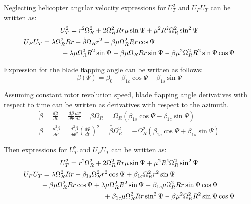 Neglecting helicopter angular velocity expressions for $U_T^2$ and $U_P U_T$ can be written as:
\begin{gather}
  \label{eq-aero-u-t-sq}
  U_T^2 =
  r^2 \Omega_R^2 + 2 \Omega_R^2 R r \mu \sin \Psi
  + \mu^2 R^2 \Omega_R^2 \sin^2 \Psi \\
  \label{eq-aero-u-p-u-t}
  \begin{multlined}[0.88\textwidth]
  U_P U_T =
  \lambda \Omega_R^2 R r - \dot \beta \Omega_R r^2
  - \beta \mu \Omega_R^2 R r \cos \Psi \\
  + \lambda \mu \Omega_R^2 R^2 \sin \Psi
  - \dot \beta \mu \Omega_R R r \sin \Psi
  - \beta \mu^2 \Omega_R^2 R^2 \sin \Psi \cos \Psi
  \end{multlined}
\end{gather}

Expression for the blade flapping angle can be written as follows: \cite{GessowMyers1985, Padfield2007, NASA-TT-F-494}
\begin{equation}
  \label{eq-aero-blade-flapping-angle}
  \beta \left( \Psi \right) = 
  \beta_0 + \beta_{1c} \cos \Psi + \beta_{1s} \sin \Psi
\end{equation}

Assuming constant rotor revolution speed, blade flapping angle derivatives with respect to time can be written as derivatives with respect to the azimuth. \cite{GessowMyers1985}
\begin{gather}
  \dot \beta = \frac{d\beta}{dt}
  = \frac{d\beta}{d\Psi} \frac{d\Psi}{dt} =
  \bar \beta \Omega_R =
  \Omega_R
  \left( \beta_{1s} \cos \Psi - \beta_{1c} \sin \Psi \right) \\
  \ddot \beta = \frac{d^2\beta}{dt^2}
  = \frac{d^2\beta}{d\Psi^2} \left( \frac{d\Psi}{dt} \right)^2 = 
  \bar{\bar \beta} \Omega_R^2
  =
  -\Omega_R^2
  \left( \beta_{1c} \cos \Psi + \beta_{1s} \sin \Psi \right)
\end{gather}

Then expressions for $U_T^2$ and $U_P U_T$ can be written as:
\begin{gather}
  U_T^2 = r^2 \Omega_R^2 + 2 \Omega_R^2 R r \mu \sin \Psi
  + \mu^2 R^2 \Omega_R^2 \sin^2 \Psi \\
  \begin{multlined}[0.88\textwidth]
    U_P U_T = \lambda \Omega_R^2 R r
    - \beta_{1s} \Omega_R^2 r^2 \cos \Psi
    + \beta_{1c} \Omega_R^2 r^2 \sin \Psi \\
    - \beta \mu \Omega_R^2 R r \cos \Psi
    + \lambda \mu \Omega_R^2 R^2 \sin \Psi
    - \beta_{1s} \mu \Omega_R^2 R r \sin \Psi \cos \Psi \\
    + \beta_{1c} \mu \Omega_R^2 R r \sin^2 \Psi
    - \beta \mu^2 \Omega_R^2 R^2 \sin \Psi \cos \Psi
  \end{multlined}
\end{gather}

